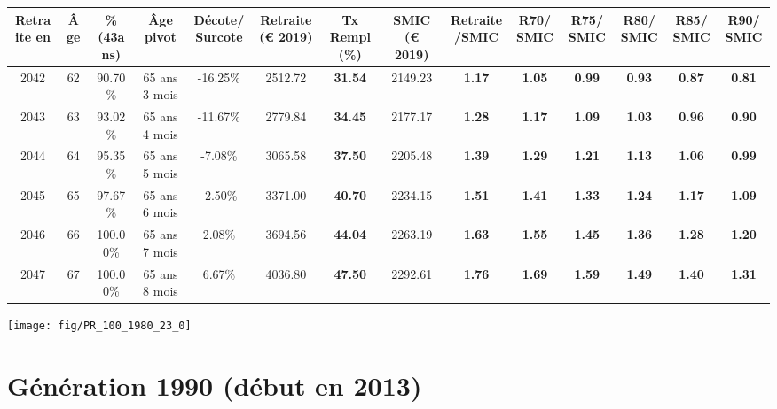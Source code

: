 \begin{adjustbox}{max width=\textwidth} 
\begin{tabular}[htb]{|c|c||c|c|c||c|c||c|c||c|c|c|c|c|} 
\hline 
 Retraite en &  Âge &  \%(43ans) &  Âge pivot &  Décote/Surcote &  Retraite (\euro{} 2019) &  Tx Rempl(\%) &  SMIC (\euro{} 2019) &  Retraite/SMIC &  R70/SMIC &  R75/SMIC &  R80/SMIC &  R85/SMIC &  R90/SMIC \\ 
\hline \hline 
 2042 &  62 &  90.70\% &  65 ans 3 mois &  -16.25\% &  2512.72 &  {\bf 31.54} &  2149.23 &  {\bf 1.17} &  {\bf 1.05} &  {\bf {\color{red} 0.99}} &  {\bf {\color{red} 0.93}} &  {\bf {\color{red} 0.87}} &  {\bf {\color{red} 0.81}} \\ 
\hline 
 2043 &  63 &  93.02\% &  65 ans 4 mois &  -11.67\% &  2779.84 &  {\bf 34.45} &  2177.17 &  {\bf 1.28} &  {\bf 1.17} &  {\bf 1.09} &  {\bf 1.03} &  {\bf {\color{red} 0.96}} &  {\bf {\color{red} 0.90}} \\ 
\hline 
 2044 &  64 &  95.35\% &  65 ans 5 mois &  -7.08\% &  3065.58 &  {\bf 37.50} &  2205.48 &  {\bf 1.39} &  {\bf 1.29} &  {\bf 1.21} &  {\bf 1.13} &  {\bf 1.06} &  {\bf {\color{red} 0.99}} \\ 
\hline 
 2045 &  65 &  97.67\% &  65 ans 6 mois &  -2.50\% &  3371.00 &  {\bf 40.70} &  2234.15 &  {\bf 1.51} &  {\bf 1.41} &  {\bf 1.33} &  {\bf 1.24} &  {\bf 1.17} &  {\bf 1.09} \\ 
\hline 
 2046 &  66 &  100.00\% &  65 ans 7 mois &  2.08\% &  3694.56 &  {\bf 44.04} &  2263.19 &  {\bf 1.63} &  {\bf 1.55} &  {\bf 1.45} &  {\bf 1.36} &  {\bf 1.28} &  {\bf 1.20} \\ 
\hline 
 2047 &  67 &  100.00\% &  65 ans 8 mois &  6.67\% &  4036.80 &  {\bf 47.50} &  2292.61 &  {\bf 1.76} &  {\bf 1.69} &  {\bf 1.59} &  {\bf 1.49} &  {\bf 1.40} &  {\bf 1.31} \\ 
\hline 
\hline 
\end{tabular} 
\end{adjustbox} 
 
 \vspace{0.1cm} 

 {\hspace{-2.2cm}\texttt{[image: fig/PR\_100\_1980\_23\_0]}} 

\newpage 
 
\section{Génération 1990 (début en 2013)\label{PR_100_1990_23_0}} 
 
